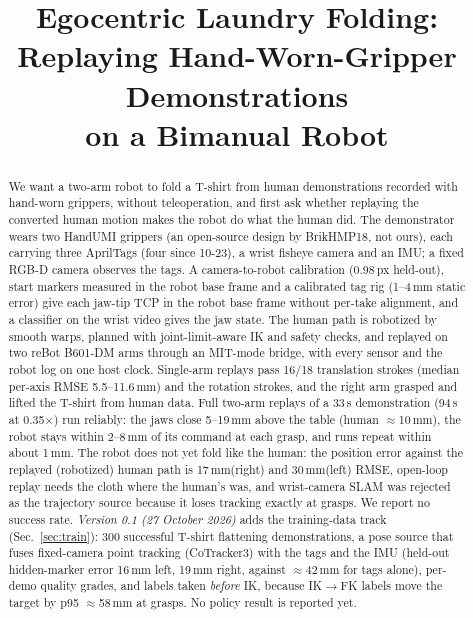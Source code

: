 \documentclass[conference,10pt]{IEEEtran}
\newcommand{\mm}{\,mm\xspace}
\begin{document}
\title{Egocentric Laundry Folding:\\Replaying Hand-Worn-Gripper Demonstrations\\on a Bimanual Robot}
\author{
}
\maketitle

\begin{abstract}
We want a two-arm robot to fold a T-shirt from human demonstrations recorded with hand-worn grippers, without
teleoperation, and first ask whether replaying the converted human motion makes the robot do what the human did. The
demonstrator wears two HandUMI grippers (an open-source design by BrikHMP18, not ours), each carrying three AprilTags (four since 10-23), a
wrist fisheye camera and an IMU; a fixed RGB-D camera observes the tags. A camera-to-robot calibration (0.98\,px held-out),
start markers measured in the robot base frame and a calibrated tag rig (1--4\mm static error) give each jaw-tip TCP in the
robot base frame without per-take alignment, and a classifier on the wrist video gives the jaw state. The human path is
robotized by smooth warps, planned with joint-limit-aware IK and safety checks, and replayed on two reBot B601-DM arms
through an MIT-mode bridge, with every sensor and the robot log on one host clock. Single-arm replays pass 16/18 translation strokes
(median per-axis RMSE 5.5--11.6\mm) and the rotation strokes, and the right arm grasped and lifted the T-shirt from human data.
Full two-arm replays of a 33\,s demonstration (94\,s at 0.35$\times$) run reliably: the jaws close 5--19\mm above the table (human $\approx$10\mm), the robot stays
within 2--8\mm of its command at each grasp, and runs repeat within about 1\mm. The robot does not yet fold like the
human: the position error against the replayed (robotized) human path is 17\mm (right) and 30\mm (left) RMSE, open-loop replay needs the cloth where
the human's was, and wrist-camera SLAM was rejected as the trajectory source because it loses tracking exactly at grasps.
We report no success rate.
\emph{Version 0.1 (27 October 2026)} adds the training-data track (Sec.~\ref{sec:train}): 300 successful T-shirt flattening
demonstrations, a pose source that fuses fixed-camera point tracking (CoTracker3) with the tags and the IMU (held-out
hidden-marker error 16\mm left, 19\mm right, against $\approx$42\mm for tags alone), per-demo quality grades, and labels taken
\emph{before} IK, because IK$\to$FK labels move the target by p95 $\approx$58\mm at grasps. No policy result is reported yet.
\end{abstract}
\end{document}
